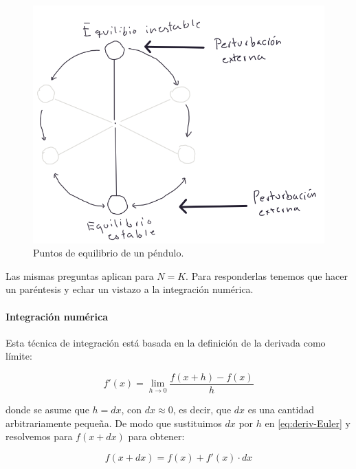 \documentclass[
]{book}
\begin{document}
\begin{figure}

{\centering \includegraphics[width=10.22in]{Unidad-IV/Puntos-equilibrio} 

}

\caption{Puntos de equilibrio de un péndulo.}\label{fig:equilibrio}
\end{figure}

Las mismas preguntas aplican para \(N=K\). Para responderlas tenemos que hacer un paréntesis y echar un vistazo a la integración numérica.

\hypertarget{integraciuxf3n-numuxe9rica}{%
\paragraph{Integración numérica}\label{integraciuxf3n-numuxe9rica}}

Esta técnica de integración está basada en la definición de la derivada como límite:

\begin{equation}
f'(x) = \lim \limits_{h \rightarrow 0} \frac{f(x + h) - f(x)}{h} \label{eq:deriv-Euler}
\end{equation}

donde se asume que \(h = dx\), con \(dx \approx 0\), es decir, que \(dx\) es una cantidad arbitrariamente pequeña. De modo que sustituimos \(dx\) por \(h\) en \eqref{eq:deriv-Euler} y resolvemos para \(f(x + dx)\) para obtener:

\begin{equation}
f(x + dx) = f(x) + f'(x) \cdot dx \label{eq:Euler}
\end{equation}
\end{document}
